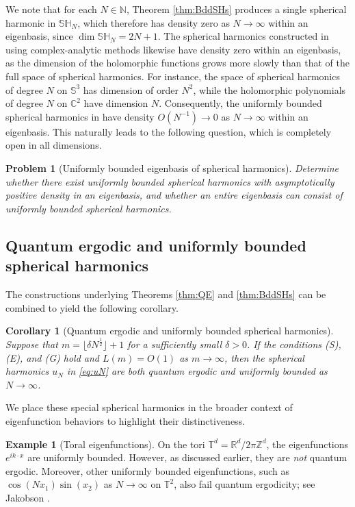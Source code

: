 \documentclass[12pt,reqno]{amsart}
\newcommand{\C}{\mathbb{C}}
\newcommand{\N}{\mathbb{N}}
\newcommand{\R}{\mathbb{R}}
\newcommand{\Sb}{\mathbb{S}}
\newcommand{\SH}{\mathbb{SH}}
\newcommand{\T}{\mathbb{T}}
\newcommand{\Z}{\mathbb{Z}}
\theoremstyle{plain}
\newtheorem{cor}[thm]{Corollary}
\newtheorem{pblm}[thm]{Problem}
\theoremstyle{definition}
\newtheorem*{ex}{Example}
\theoremstyle{remark}
\numberwithin{equation}{section}
\begin{document}
We note that for each $N\in\N$, Theorem \ref{thm:BddSHs} produces a single spherical harmonic in $\SH_N$, which therefore has density zero as $N\to\infty$ within an eigenbasis, since $\dim\SH_N=2N+1$. The spherical harmonics constructed in \cite{Bo1, Shi, Bo2, MOC} using complex-analytic methods likewise have density zero within an eigenbasis, as the dimension of the holomorphic functions grows more slowly than that of the full space of spherical harmonics. For instance, the space of spherical harmonics of degree $N$ on $\Sb^3$ has dimension of order $N^2$, while the holomorphic polynomials of degree $N$ on $\C^2$ have dimension $N$. Consequently, the uniformly bounded spherical harmonics in \cite{Bo1} have density $O(N^{-1})\to0$ as $N\to\infty$ within an eigenbasis. This naturally leads to the following question, which is completely open in all dimensions.

\begin{pblm}[Uniformly bounded eigenbasis of spherical harmonics]
Determine whether there exist uniformly bounded spherical harmonics with asymptotically positive density in an eigenbasis, and whether an entire eigenbasis can consist of uniformly bounded spherical harmonics.
\end{pblm}


\subsection{Quantum ergodic and uniformly bounded spherical harmonics}
The constructions underlying Theorems \ref{thm:QE} and \ref{thm:BddSHs} can be combined to yield the following corollary.

\begin{cor}[Quantum ergodic and uniformly bounded spherical harmonics]\label{cor}
Suppose that $m=\lfloor\delta N^\frac12\rfloor+1$ for a sufficiently small $\delta>0$. If the conditions (S), (E), and (G) hold and $L(m)=O(1)$ as $m\to\infty$, then the spherical harmonics $u_N$ in \eqref{eq:uN} are both quantum ergodic and uniformly bounded as $N\to\infty$.
\end{cor}

We place these special spherical harmonics in the broader context of eigenfunction behaviors to highlight their distinctiveness.

\begin{ex}[Toral eigenfunctions]
On the tori $\T^d=\R^d/2\pi\Z^d$, the eigenfunctions $e^{ik\cdot x}$ are uniformly bounded. However, as discussed earlier, they are \emph{not} quantum ergodic. Moreover, other uniformly bounded eigenfunctions, such as $\cos(Nx_1)\sin(x_2)$ as $N\to\infty$ on $\T^2$, also fail quantum ergodicity; see Jakobson \cite{J}.
\end{ex}
\end{document}
